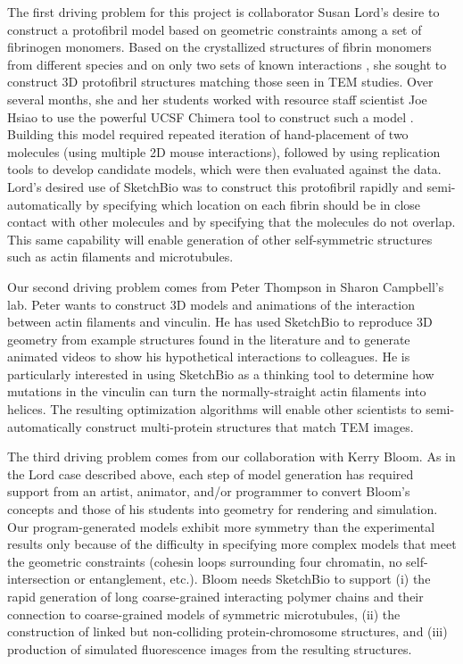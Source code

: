 \documentclass[twocolumn]{bmcart}%
\begin{document}
The first driving problem for this project is collaborator Susan Lord's desire to construct a protofibril model based on geometric constraints among a set of fibrinogen monomers.  Based on the crystallized structures of fibrin monomers from different species and on only two sets of known interactions \cite{lord2007fibrinogen}, she sought to construct 3D protofibril structures matching those seen in TEM studies.  Over several months, she and her students worked with resource staff scientist Joe Hsiao to use the powerful UCSF Chimera tool to construct such a model \cite{lordSubmitted}.  Building this model required repeated iteration of hand-placement of two molecules (using multiple 2D mouse interactions), followed by using replication tools to develop candidate models, which were then evaluated against the data.  Lord's desired use of SketchBio was to construct this protofibril rapidly and semi-automatically by specifying which location on each fibrin should be in close contact with other molecules and by specifying that the molecules do not overlap.  This same capability will enable generation of other self-symmetric structures such as actin filaments and microtubules.

Our second driving problem comes from Peter Thompson in Sharon Campbell's lab.  Peter wants to construct 3D models and animations of the interaction between actin filaments and vinculin.  He has used SketchBio to reproduce 3D geometry from example structures found in the literature and to generate animated videos to show his hypothetical interactions to colleagues.  He is particularly interested in using SketchBio as a thinking tool to determine how mutations in the vinculin can turn the normally-straight actin filaments into helices.  The resulting optimization algorithms will enable other scientists to semi-automatically construct multi-protein structures that match TEM images.

The third driving problem comes from our collaboration with Kerry Bloom.  As in the Lord case described above, each step of model generation has required support from an artist, animator, and/or programmer to convert Bloom's concepts and those of his students into geometry for rendering and simulation.  Our program-generated models exhibit more symmetry than the experimental results only because of the difficulty in specifying more complex models that meet the geometric constraints (cohesin loops surrounding four chromatin, no self-intersection or entanglement, etc.).  Bloom needs SketchBio to support (i) the rapid generation of long coarse-grained interacting polymer chains and their connection to coarse-grained models of symmetric microtubules, (ii) the construction of linked but non-colliding protein-chromosome structures, and (iii) production of simulated fluorescence images from the resulting structures.
\end{document}
